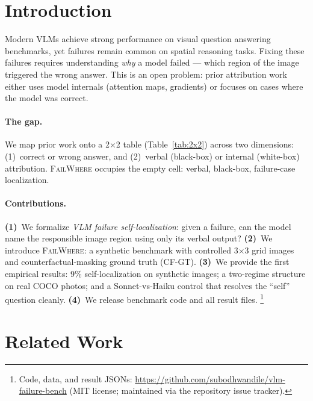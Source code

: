 \documentclass[twoside,11pt]{article}
\begin{document}
\section{Introduction}

Modern VLMs achieve strong performance on visual question answering benchmarks,
yet failures remain common on spatial reasoning tasks.
Fixing these failures requires understanding \emph{why} a model failed —
which region of the image triggered the wrong answer.
This is an open problem: prior attribution work either uses model internals
(attention maps, gradients) or focuses on cases where the model was correct.

\paragraph{The gap.}
We map prior work onto a 2$\times$2 table
(Table~\ref{tab:2x2}) across two dimensions:
(1)~correct or wrong answer, and
(2)~verbal (black-box) or internal (white-box) attribution.
\textsc{FailWhere} occupies the empty cell: verbal, black-box, failure-case localization.

\paragraph{Contributions.}
\textbf{(1)}~We formalize \emph{VLM failure self-localization}: given a failure,
can the model name the responsible image region using only its verbal output?
\textbf{(2)}~We introduce \textsc{FailWhere}: a synthetic benchmark with controlled
3$\times$3 grid images and counterfactual-masking ground truth (CF-GT).
\textbf{(3)}~We provide the first empirical results:
9\% self-localization on synthetic images;
a two-regime structure on real COCO photos;
and a Sonnet-vs-Haiku control that resolves the ``self'' question cleanly.
\textbf{(4)}~We release benchmark code and all result files.%
\footnote{Code, data, and result JSONs:
\url{https://github.com/subodhwandile/vlm-failure-bench}
(MIT license; maintained via the repository issue tracker).}


\section{Related Work}
\end{document}
